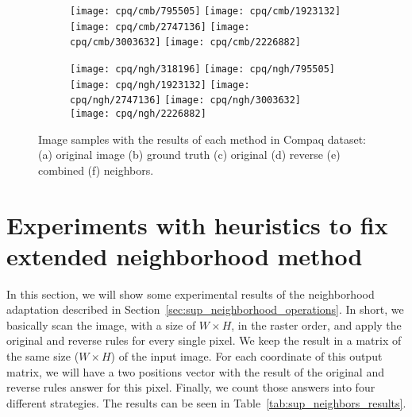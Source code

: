 \begin{figure*}[!htb]
\begin{subfigure}[t]{0.15\textwidth}
        \texttt{[image: cpq/cmb/795505]}
        \texttt{[image: cpq/cmb/1923132]}
        \texttt{[image: cpq/cmb/2747136]}
        \texttt{[image: cpq/cmb/3003632]}
        \texttt{[image: cpq/cmb/2226882]}
        \caption{}
    \end{subfigure}
    \begin{subfigure}[t]{0.15\textwidth}
        \texttt{[image: cpq/ngh/318196]}
        \texttt{[image: cpq/ngh/795505]}
        \texttt{[image: cpq/ngh/1923132]}
        \texttt{[image: cpq/ngh/2747136]}
        \texttt{[image: cpq/ngh/3003632]}
        \texttt{[image: cpq/ngh/2226882]}
        \caption{}
    \end{subfigure}

    \caption[Image samples with the results of each method in Compaq dataset]{Image samples with the results of each method in Compaq dataset: (a) original image (b) ground truth (c) original \cite{brancati:17} (d) reverse (e) combined (f) neighbors.}
    \label{fig:results_cpq}
\end{figure*}
\clearpage

\section{Experiments with heuristics to fix extended neighborhood method}
\label{sec:sno_experiments}
In this section, we will show some experimental results of the neighborhood adaptation described in Section~\ref{sec:sup_neighborhood_operations}. In short, we basically scan the image, with a size of $W \times H$, in the raster order, and apply the original and reverse rules for every single pixel. We keep the result in a matrix of the same size ($W \times H$) of the input image. For each coordinate of this output matrix, we will have a two positions vector with the result of the original and reverse rules answer for this pixel. Finally, we count those answers into four different strategies. The results can be seen in Table~\ref{tab:sup_neighbors_results}.

